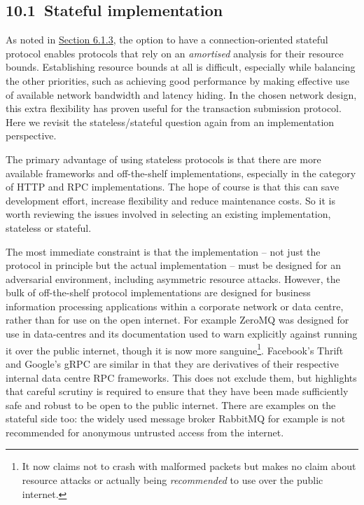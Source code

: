 \documentclass[11pt,a4paper]{article}
\begin{document}
\hypertarget{stateful-implementation}{%
\subsection{​10.1​~Stateful
implementation}\label{stateful-implementation}}

As noted in \protect\hyperlink{stateful-chain-following}{{Section
6.1.3}}, the option to have a connection-oriented stateful protocol
enables protocols that rely on an \emph{amortised} analysis for their
resource bounds. Establishing resource bounds at all is difficult,
especially while balancing the other priorities, such as achieving good
performance by making effective use of available network bandwidth and
latency hiding. In the chosen network design, this extra flexibility has
proven useful for the transaction submission protocol. Here we revisit
the stateless/stateful question again from an implementation
perspective.

The primary advantage of using stateless protocols is that there are
more available frameworks and off-the-shelf implementations, especially
in the category of HTTP and RPC implementations. The hope of course is
that this can save development effort, increase flexibility and reduce
maintenance costs. So it is worth reviewing the issues involved in
selecting an existing implementation, stateless or stateful.

The most immediate constraint is that the implementation -- not just the
protocol in principle but the actual implementation -- must be designed
for an adversarial environment, including asymmetric resource attacks.
However, the bulk of off-the-shelf protocol implementations are designed
for business information processing applications within a corporate
network or data centre, rather than for use on the open internet. For
example ZeroMQ was designed for use in data-centres and its
documentation used to warn explicitly against running it over the public
internet, though it is now more sanguine\footnote{It now claims not to
  crash with malformed packets but makes no claim about resource attacks
  or actually being \emph{recommended} to use over the public internet.}.
Facebook's Thrift and Google's gRPC are similar in that they are
derivatives of their respective internal data centre RPC frameworks.
This does not exclude them, but highlights that careful scrutiny is
required to ensure that they have been made sufficiently safe and robust
to be open to the public internet. There are examples on the stateful
side too: the widely used message broker RabbitMQ for example is not
recommended for anonymous untrusted access from the internet.
\end{document}
